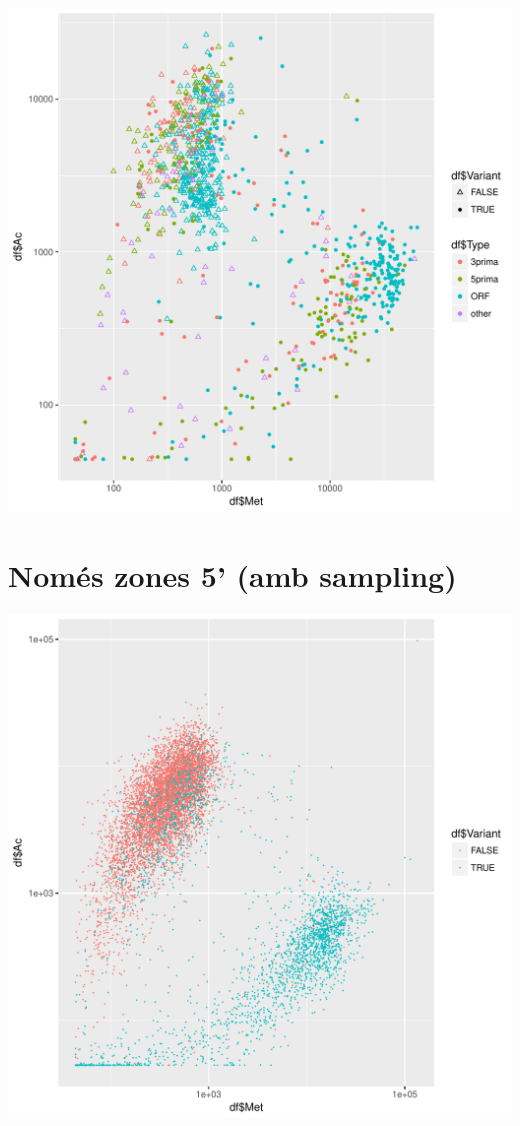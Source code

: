 \documentclass{article}\usepackage[]{graphicx}\usepackage[]{color}
\makeatletter
\def\maxwidth{ %
  \ifdim\Gin@nat@width>\linewidth
    \linewidth
  \else
    \Gin@nat@width
  \fi
}
\newenvironment{knitrout}{}{} %
\makeatother
\begin{document}
\begin{knitrout}
\color{fgcolor}
\includegraphics[width=\maxwidth]{figure/plot_variant_sampling_allvariables-1} 

\end{knitrout}
\clearpage
\section{Només zones 5' (amb sampling)}
\begin{knitrout}
\color{fgcolor}
\includegraphics[width=\maxwidth]{figure/plot_5_var-1} 

\end{knitrout}
\clearpage
\end{document}
